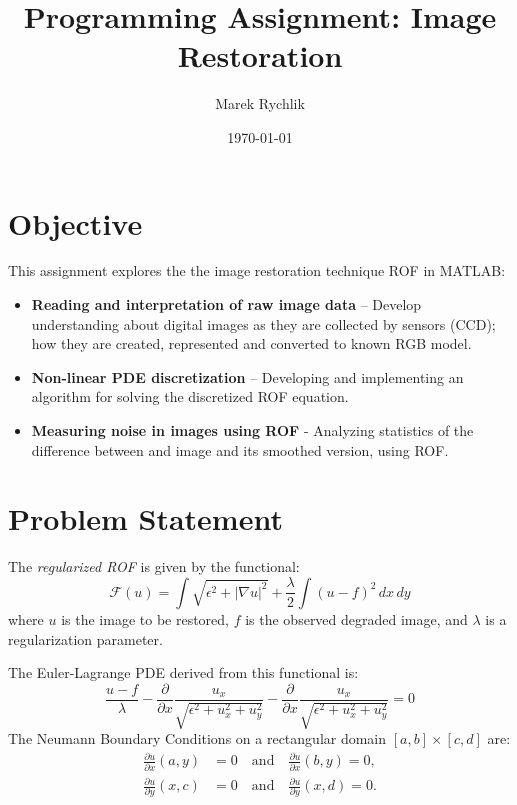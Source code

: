 \documentclass{article}
\title{Programming Assignment: Image Restoration}
\author{Marek Rychlik}
\date{\today}
\begin{document}
\maketitle

\section{Objective}
This assignment explores the the image restoration technique ROF in MATLAB:
\begin{itemize}
\item \textbf{Reading and interpretation of raw image data} – Develop
  understanding about digital images as they are collected by sensors
  (CCD); how they are created, represented and converted to known RGB
  model.

\item \textbf{Non-linear PDE discretization} –
  Developing and implementing an algorithm for solving the discretized
  ROF equation.
  
\item \textbf{Measuring noise in images using ROF} - Analyzing
  statistics of the difference between and image and its smoothed
  version, using ROF.

\end{itemize}

\section{Problem Statement}
The \emph{regularized ROF} is given by the functional:
\[ \mathcal{F}(u) = \int \sqrt{\epsilon^2 + |\nabla u|^2} + \frac{\lambda}{2} \int (u - f)^2 \, dx \, dy \]
%
where \( u \) is the image to be restored, \( f \) is the observed
degraded image, and \( \lambda \) is a regularization parameter.

The Euler-Lagrange PDE derived from this functional is:
\[
\frac{u - f}{\lambda} - \frac{\partial}{\partial x} \frac{u_x}{\sqrt{\epsilon^2 + u_x^2 + u_y^2}}
- \frac{\partial}{\partial x} \frac{u_x}{\sqrt{\epsilon^2 + u_x^2 + u_y^2}}
= 0
\]
%
The Neumann Boundary Conditions on a rectangular domain \( [a, b] \times [c, d] \) are:
\[
\begin{aligned}
  \frac{\partial u}{\partial x}(a, y) &= 0 \quad \text{and} \quad \frac{\partial u}{\partial x}(b, y) = 0, \\
  \frac{\partial u}{\partial y}(x, c) &= 0 \quad \text{and} \quad \frac{\partial u}{\partial y}(x, d) = 0.
\end{aligned}
\]
\end{document}

